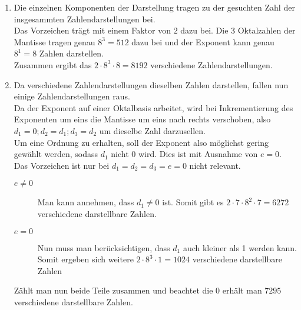 \documentclass[a4paper,11pt]{article}             %
\begin{document}

\begin{enumerate}

\item Die einzelnen Komponenten der Darstellung tragen zu der gesuchten Zahl der insgesammten Zahlendarstellungen bei.\\
Das Vorzeichen trägt mit einem Faktor von $2$ dazu bei.
Die 3 Oktalzahlen der Mantisse tragen genau $8^3 = 512$ dazu bei
und der Exponent kann genau $8^1 = 8$ Zahlen darstellen.\\
Zusammen ergibt das $2 \cdot 8^3 \cdot 8 = 8192$ verschiedene Zahlendarstellungen.

\item Da verschiedene Zahlendarstellungen dieselben Zahlen darstellen, fallen nun einige Zahlendarstellungen raus.\\
Da der Exponent auf einer Oktalbasis arbeitet, wird bei Inkrementierung des Exponenten um eins die Mantisse um eins nach rechts verschoben, also $d_1 = 0; d_2 = d_1; d_3 = d_2$ um dieselbe Zahl darzusellen.\\
Um eine Ordnung zu erhalten, soll der Exponent also möglichst gering gewählt werden, sodass $d_1$ nicht 0 wird. Dies ist mit Ausnahme von $e=0$.\\
Das Vorzeichen ist nur bei $d_1 = d_2 = d_3 = e = 0$ nicht relevant.
\begin{description}
\item [$e \neq 0$]
Man kann annehmen, dass $d_1 \neq 0$ ist. Somit gibt es $2 \cdot 7 \cdot 8^2 \cdot 7 = 6272$ verschiedene darstellbare Zahlen.
\item [$e = 0$]
Nun muss man berücksichtigen, dass $d_1$ auch kleiner als 1 werden kann. Somit ergeben sich weitere $2 \cdot 8^3 \cdot 1 = 1024$ verschiedene darstellbare Zahlen
\end{description}
Zählt man nun beide Teile zusammen und beachtet die 0 erhält man $7295$ verschiedene darstellbare Zahlen.

\end{enumerate}
\end{document}
